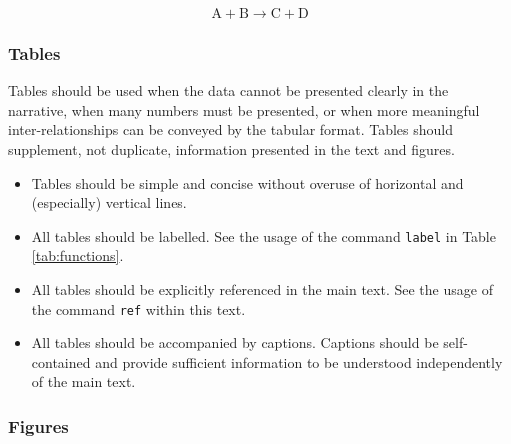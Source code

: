 \documentclass[
	german,
	accentcolor=9c,%
	type=intern,
	marginpar=false
	]{tudapub}
\begin{document}
\begin{equation}
\mathrm{A + B \longrightarrow C + D}
\label{eq:reaction}
\end{equation}


\subsubsection{Tables}  %

Tables should be used when the data cannot be presented clearly in the narrative, when many numbers must be presented, or when more meaningful inter-relationships can be conveyed by the tabular format. Tables should supplement, not duplicate, information presented in the text and figures. 

\begin{itemize}  
\item Tables should be simple and concise without overuse of horizontal and (especially) vertical lines.
\item All tables should be labelled. See the usage of the command \texttt{label} in Table \ref{tab:functions}.
\item All tables should be explicitly referenced in the main text. See the usage of the command \texttt{ref} within this text.
\item All tables should be accompanied by captions. Captions should be self-contained and provide sufficient information to be understood independently of the main text.
\end{itemize}

\subsubsection{Figures}  %
\end{document}
